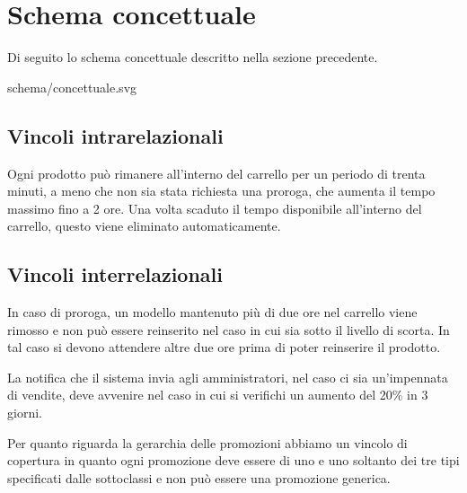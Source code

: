 \section{Schema concettuale}
Di seguito lo schema concettuale descritto nella sezione precedente.

\begin{center}
	 {schema/concettuale.svg}
\end{center}

\subsection{Vincoli intrarelazionali}
Ogni prodotto può rimanere all'interno del carrello per un periodo di trenta minuti, a meno che
non sia stata richiesta una proroga, che aumenta il tempo massimo fino a 2 ore. Una volta
scaduto il tempo disponibile all'interno del carrello, questo viene eliminato automaticamente.

\subsection{Vincoli interrelazionali}
In caso di proroga, un modello mantenuto più di due ore nel carrello viene rimosso e non può
essere reinserito nel caso in cui sia sotto il livello di scorta. In tal caso si devono attendere
altre due ore prima di poter reinserire il prodotto.

La notifica che il sistema invia agli amministratori, nel caso ci sia un'impennata di vendite,
deve avvenire nel caso in cui si verifichi un aumento del 20\% in 3 giorni.

Per quanto riguarda la gerarchia delle promozioni abbiamo un vincolo di copertura in quanto ogni
promozione deve essere di uno e uno soltanto dei tre tipi specificati dalle sottoclassi e non può
essere una promozione generica.